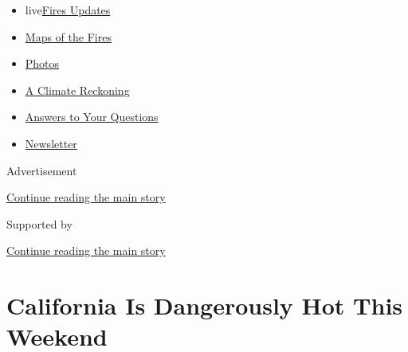 \begin{itemize}
\tightlist
\item
  live\href{https://www.nytimes3xbfgragh.onion/2020/09/12/us/wildfires-live-updates.html?name=styln-california-wildfires\&region=TOP_BANNER\&block=storyline_menu_recirc\&action=click\&pgtype=Article\&impression_id=bdc0eea0-f52e-11ea-80db-3b33c18ed3ce\&variant=undefined}{Fires
  Updates}
\item
  \href{https://www.nytimes3xbfgragh.onion/interactive/2020/us/fires-map-tracker.html?name=styln-california-wildfires\&region=TOP_BANNER\&block=storyline_menu_recirc\&action=click\&pgtype=Article\&impression_id=bdc0eea1-f52e-11ea-80db-3b33c18ed3ce\&variant=undefined}{Maps
  of the Fires}
\item
  \href{https://www.nytimes3xbfgragh.onion/article/wildfires-photos-california-oregon-washington-state.html?name=styln-california-wildfires\&region=TOP_BANNER\&block=storyline_menu_recirc\&action=click\&pgtype=Article\&impression_id=bdc0eea2-f52e-11ea-80db-3b33c18ed3ce\&variant=undefined}{Photos}
\item
  \href{https://www.nytimes3xbfgragh.onion/2020/09/10/us/climate-change-california-wildfires.html?name=styln-california-wildfires\&region=TOP_BANNER\&block=storyline_menu_recirc\&action=click\&pgtype=Article\&impression_id=bdc0eea3-f52e-11ea-80db-3b33c18ed3ce\&variant=undefined}{A
  Climate Reckoning}
\item
  \href{https://www.nytimes3xbfgragh.onion/article/wildfires-california-oregon-washington.html?name=styln-california-wildfires\&region=TOP_BANNER\&block=storyline_menu_recirc\&action=click\&pgtype=Article\&impression_id=bdc115b0-f52e-11ea-80db-3b33c18ed3ce\&variant=undefined}{Answers
  to Your Questions}
\item
  \href{https://www.nytimes3xbfgragh.onion/2020/09/09/us/california-wildfires.html?name=styln-california-wildfires\&region=TOP_BANNER\&block=storyline_menu_recirc\&action=click\&pgtype=Article\&impression_id=bdc115b1-f52e-11ea-80db-3b33c18ed3ce\&variant=undefined}{Newsletter}
\end{itemize}

Advertisement

\protect\hyperlink{after-top}{Continue reading the main story}

Supported by

\protect\hyperlink{after-sponsor}{Continue reading the main story}

\hypertarget{california-is-dangerously-hot-this-weekend}{%
\section{California Is Dangerously Hot This
Weekend}\label{california-is-dangerously-hot-this-weekend}}

